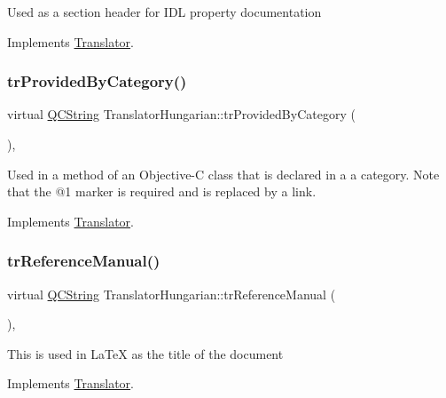 Used as a section header for I\+DL property documentation 

Implements \mbox{\hyperlink{class_translator}{Translator}}.

\mbox{\label{class_translator_hungarian_ac80f2158220d73ded4d6f604d4352a86}} 
\subsubsection{\texorpdfstring{trProvidedByCategory()}{trProvidedByCategory()}}
{\footnotesize\ttfamily virtual \mbox{\hyperlink{class_q_c_string}{Q\+C\+String}} Translator\+Hungarian\+::tr\+Provided\+By\+Category (\begin{DoxyParamCaption}{ }\end{DoxyParamCaption})\hspace{0.3cm}{\ttfamily [inline]}, {\ttfamily [virtual]}}

Used in a method of an Objective-\/C class that is declared in a a category. Note that the @1 marker is required and is replaced by a link. 

Implements \mbox{\hyperlink{class_translator}{Translator}}.

\mbox{\label{class_translator_hungarian_af398e505088f633dc2f250cbd42cc5d0}} 
\subsubsection{\texorpdfstring{trReferenceManual()}{trReferenceManual()}}
{\footnotesize\ttfamily virtual \mbox{\hyperlink{class_q_c_string}{Q\+C\+String}} Translator\+Hungarian\+::tr\+Reference\+Manual (\begin{DoxyParamCaption}{ }\end{DoxyParamCaption})\hspace{0.3cm}{\ttfamily [inline]}, {\ttfamily [virtual]}}

This is used in La\+TeX as the title of the document 

Implements \mbox{\hyperlink{class_translator}{Translator}}.

